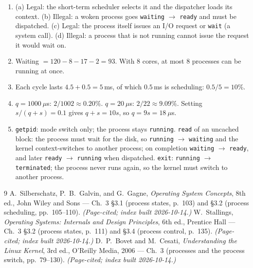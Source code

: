 \documentclass[11pt]{article}
\begin{document}
\begingroup\small
\begin{enumerate}
  \item (a) Legal: the short-term scheduler selects it and the dispatcher loads
        its context. (b) Illegal: a woken process goes \texttt{waiting}
        $\to$ \texttt{ready} and must be dispatched. (c) Legal: the process
        itself issues an I/O request or \texttt{wait} (a system call).
        (d) Illegal: a process that is not running cannot issue the request it
        would wait on.
  \item Waiting $= 120 - 8 - 17 - 2 = 93$. With 8 cores, at most 8 processes
        can be running at once.
  \item Each cycle lasts $4.5 + 0.5 = 5$\,ms, of which $0.5$\,ms is scheduling:
        $0.5/5 = 10\%$.
  \item $q = 1000\ \mu$s: $2/1002 \approx 0.20\%$. $q = 20\ \mu$s:
        $2/22 \approx 9.09\%$. Setting $s/(q+s) = 0.1$ gives $q + s = 10s$, so
        $q = 9s = 18\ \mu$s.
  \item \texttt{getpid}: mode switch only; the process stays \texttt{running}.
        \texttt{read} of an uncached block: the process must wait for the disk,
        so \texttt{running} $\to$ \texttt{waiting} and the kernel context-switches
        to another process; on completion \texttt{waiting} $\to$ \texttt{ready},
        and later \texttt{ready} $\to$ \texttt{running} when dispatched.
        \texttt{exit}: \texttt{running} $\to$ \texttt{terminated}; the process
        never runs again, so the kernel must switch to another process.
\end{enumerate}
\endgroup

\begin{thebibliography}{9}
A.~Silberschatz, P.~B.~Galvin, and G.~Gagne, \emph{Operating System Concepts},
8th ed., John Wiley and Sons --- Ch.~3 \S3.1 (process states, p.~103) and
\S3.2 (process scheduling, pp.~105--110). \emph{(Page-cited; index built
2026-10-14.)}
W.~Stallings, \emph{Operating Systems: Internals and Design Principles}, 6th
ed., Prentice Hall --- Ch.~3 \S3.2 (process states, p.~111) and \S3.4
(process control, p.~135). \emph{(Page-cited; index built 2026-10-14.)}
D.~P.~Bovet and M.~Cesati, \emph{Understanding the Linux Kernel}, 3rd ed.,
O'Reilly Media, 2006 --- Ch.~3 (processes and the process switch,
pp.~79--130). \emph{(Page-cited; index built 2026-10-14.)}
\end{thebibliography}
\end{document}
